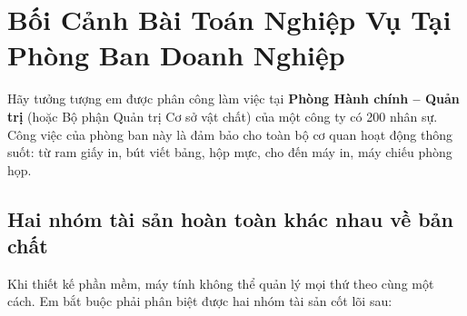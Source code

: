 \documentclass[11pt,a4paper]{article}
\begin{document}
\section{Bối Cảnh Bài Toán Nghiệp Vụ Tại Phòng Ban Doanh Nghiệp}

Hãy tưởng tượng em được phân công làm việc tại \textbf{Phòng Hành chính -- Quản trị} (hoặc Bộ phận Quản trị Cơ sở vật chất) của một công ty có 200 nhân sự. Công việc của phòng ban này là đảm bảo cho toàn bộ cơ quan hoạt động thông suốt: từ ram giấy in, bút viết bảng, hộp mực, cho đến máy in, máy chiếu phòng họp.

\subsection{Hai nhóm tài sản hoàn toàn khác nhau về bản chất}

Khi thiết kế phần mềm, máy tính không thể quản lý mọi thứ theo cùng một cách. Em bắt buộc phải phân biệt được hai nhóm tài sản cốt lõi sau:
\end{document}
